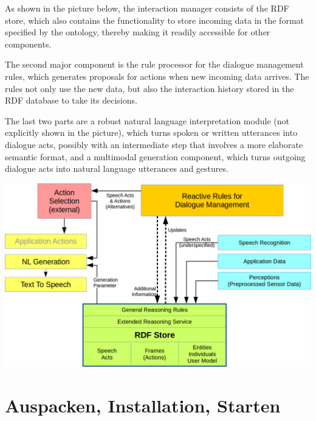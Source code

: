 \documentclass[a4paper]{article}
\begin{document}
As shown in the picture below, the interaction manager consists of the RDF
store, which also contains the functionality to store incoming data in the
format specified by the ontology, thereby making it readily accessible for
other components.

The second major component is the rule processor for the dialogue management
rules, which generates proposals for actions when new incoming data
arrives. The rules not only use the new data, but also the interaction history
stored in the RDF database to take its decisions.

The last two parts are a robust natural language interpretation module (not
explicitly shown in the picture), which turns spoken or written utterances
into dialogue acts, possibly with an intermediate step that involves a more
elaborate semantic format, and a multimodal generation component, which turns
outgoing dialogue acts into natural language utterances and gestures.

\vspace*{4ex}

\includegraphics[width=.9\textwidth]{rudimant.png}



\section{Auspacken, Installation, Starten}




\end{document}
